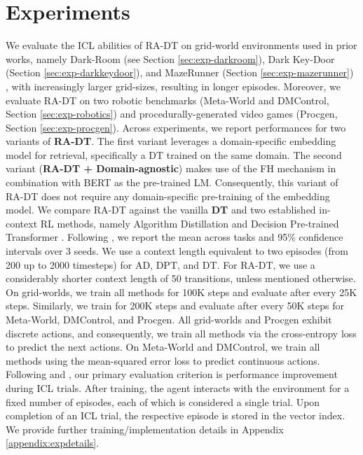 \documentclass{article}
\begin{document}
\section{Experiments}\label{sec:experiments}
We evaluate the ICL abilities of RA-DT on grid-world environments used in prior works, namely Dark-Room (see Section \ref{sec:exp-darkroom}), Dark Key-Door (Section \ref{sec:exp-darkkeydoor}), and MazeRunner (Section \ref{sec:exp-mazerunner}) \citep{Laskin:22,Lee:22, Grigsby:23}, with increasingly larger grid-sizes, resulting in longer episodes.
Moreover, we evaluate RA-DT on two robotic benchmarks (Meta-World and DMControl, Section \ref{sec:exp-robotics}) and procedurally-generated video games (Procgen, Section \ref{sec:exp-procgen}).
Across experiments, we report performances for two variants of \textbf{RA-DT}.
The first variant leverages a domain-specific embedding model for retrieval, specifically a DT trained on the same domain.
The second variant (\textbf{RA-DT + Domain-agnostic}) makes use of the FH mechanism in combination with BERT \citep{Devlin:18} as the pre-trained LM.
Consequently, this variant of RA-DT does not require any domain-specific pre-training of the embedding model.
We compare RA-DT against the vanilla \textbf{DT} and two established in-context RL methods, namely Algorithm Distillation \citep[\textbf{AD}]{Laskin:22} and Decision Pre-trained Transformer \citep[\textbf{DPT}]{Lee:23}.
Following \citet{Agarwal:21}, we report the mean across tasks and 95\% confidence intervals over 3 seeds.
We use a context length equivalent to two episodes (from 200 up to 2000 timesteps) for AD, DPT, and DT.
For RA-DT, we use a considerably shorter context length of 50 transitions, unless mentioned otherwise.
On grid-worlds, we train all methods for 100K steps and evaluate after every 25K steps.
Similarly, we train for 200K steps and evaluate after every 50K steps for Meta-World, DMControl, and Procgen.
All grid-worlds and Procgen exhibit discrete actions, and consequently, we train all methods via the cross-entropy loss to predict the next actions.
On Meta-World and DMControl, we train all methods using the mean-squared error loss to predict continuous actions.
Following \citet{Laskin:22} and \citet{Lee:23}, our primary evaluation criterion is performance improvement during ICL trials.
After training, the agent interacts with the environment for a fixed number of episodes, each of which is considered a single trial.
Upon completion of an ICL trial, the respective episode is stored in the vector index.
We provide further training/implementation details in Appendix \ref{appendix:expdetails}.
\end{document}
